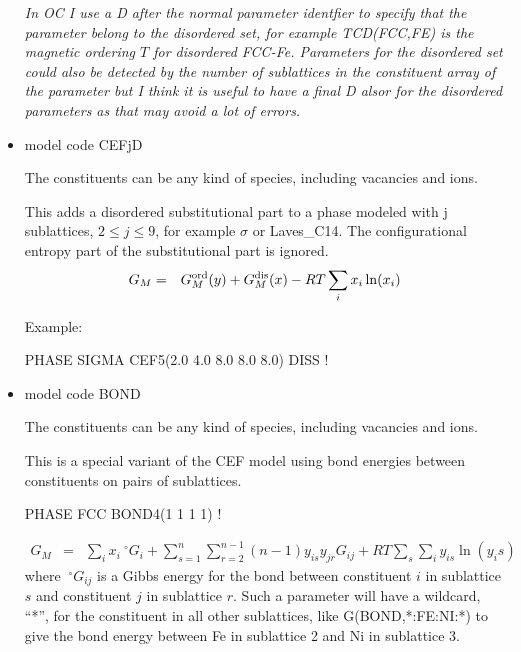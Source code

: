 \documentclass[12pt]{article}
\begin{document}
\begin{itemize}
  {\em In OC I use a D after the normal parameter identfier to specify
    that the parameter belong to the disordered set, for example
    TCD(FCC,FE) is the magnetic ordering $T$ for disordered FCC-Fe.
    Parameters for the disordered set could also be detected by the
    number of sublattices in the constituent array of the parameter
    but I think it is useful to have a final D alsor for the
    disordered parameters as that may avoid a lot of errors.}

\item model code CEFjD

  The constituents can be any kind of species, including vacancies and
  ions.

  This adds a disordered substitutional part to a phase modeled with j
  sublattices, $2\leq j \leq 9$, for example $\sigma$ or Laves\_C14.
  The configurational entropy part of the substitutional part is
  ignored.
  \begin{eqnarray}
    G_M &=& G_M^{\rm ord}(y) + G_M^{\rm dis}(x) - RT\sum_i x_i\ln(x_i)
  \end{eqnarray}

  Example:

  PHASE SIGMA CEF5(2.0 4.0 8.0 8.0 8.0) DISS !
  
\item model code BOND

  The constituents can be any kind of species, including vacancies and
  ions.

  This is a special variant of the CEF model using bond energies between
  constituents on pairs of sublattices.

  PHASE FCC BOND4(1 1 1 1) !

  \begin{eqnarray}
    G_M &=& \sum_i x_i ~^{\circ}G_i + \sum_{s=1}^n \sum_{r=2}^{n-1} (n-1) y_{is} y_{jr}G_{ij}+RT\sum_s \sum_i y_{is}\ln(y_is)
  \end{eqnarray}
  where $~^{\circ}G_{ij}$ is a Gibbs energy for the bond between
  constituent $i$ in sublattice $s$ and constituent $j$ in sublattice
  $r$.  Such a parameter will have a wildcard, ``*'', for the
  constituent in all other sublattices, like G(BOND,*:FE:NI:*) to give
  the bond energy between Fe in sublattice 2 and Ni in sublattice 3.
\end{itemize}

\newpage
\end{document}
